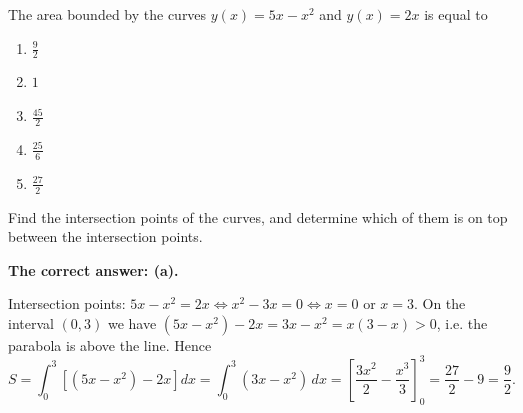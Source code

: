 
\begin{question}
The area bounded by the curves $y(x)=5x-x^2$ and $y(x)=2x$ is equal to
\begin{enumerate}
  \item[(a)] $\frac92$
  \item[(b)] $1$
  \item[(c)] $\frac{45}{2}$
  \item[(d)] $\frac{25}{6}$
  \item[(e)] $\frac{27}{2}$
\end{enumerate}
\end{question}

\begin{hint}
Find the intersection points of the curves, and determine which of them is on top between the intersection points.
\end{hint}

\begin{solution}
\textbf{The correct answer: (a).}

Intersection points: $5x-x^2=2x\iff x^2-3x=0\iff x=0$ or $x=3$.
On the interval $(0,3)$ we have $(5x-x^2)-2x = 3x-x^2 = x(3-x)>0$, i.e. the parabola is above the line. Hence
\[ S=\int_0^3\left[(5x-x^2)-2x\right]dx = \int_0^3(3x-x^2)\,dx = \left[\frac{3x^2}{2}-\frac{x^3}{3}\right]_0^3 = \frac{27}{2}-9 = \frac92. \]
\end{solution}
